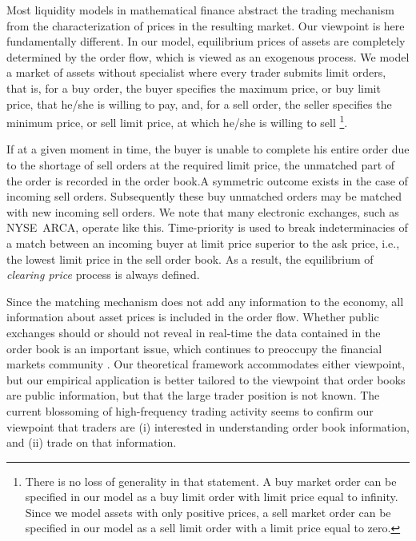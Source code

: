 \documentclass{article}
\begin{document}
Most liquidity models in mathematical finance abstract the trading mechanism
from the characterization of prices in the resulting market. Our viewpoint
is here fundamentally different. In our model, equilibrium prices of assets
are completely determined by the order flow, which is viewed as an exogenous
process. We model a market of assets without specialist where every trader
submits limit orders, that is, for a buy order, the buyer specifies the
maximum price, or buy limit price, that he/she is willing to pay, and, for a
sell order, the seller specifies the minimum price, or sell limit price, at
which he/she is willing to sell \footnote{%
There is no loss of generality in that statement. A buy market order can be
specified in our model as a buy limit order with limit price equal to
infinity. Since we model assets with only positive prices, a sell market
order can be specified in our model as a sell limit order with a limit price
equal to zero.}.

If at a given moment in time, the buyer is unable to complete his entire
order due to the shortage of sell orders at the required limit price, the
unmatched part of the order is recorded in the order book.A symmetric
outcome exists in the case of incoming sell orders. Subsequently these buy
unmatched orders may be matched with new incoming sell orders. We note that
many electronic exchanges, such as NYSE\ ARCA, operate like this.
Time-priority is used to break indeterminacies of a match between an
incoming buyer at limit price superior to the ask price, i.e., the lowest
limit price in the sell order book. As a result, the equilibrium of \textit{%
clearing price} process is always defined.

Since the matching mechanism does not add any information to the economy,
all information about asset prices is included in the order flow. Whether
public exchanges should or should not reveal in real-time the data contained
in the order book is an important issue, which continues to preoccupy the
financial markets community \cite{WW02}. Our theoretical framework
accommodates either viewpoint, but our empirical application is better
tailored to the viewpoint that order books are public information, but that
the large trader position is not known. The current blossoming of
high-frequency trading activity \cite{BRZ,BLT06,Eng00,Hau08} seems to
confirm our viewpoint that traders are (i) interested in understanding order
book information, and (ii) trade on that information.
\end{document}
